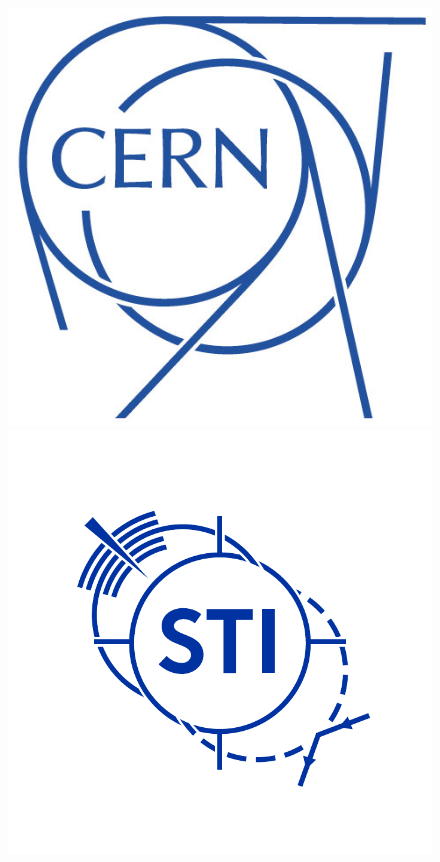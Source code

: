 \documentclass[encoding=utf8,british]{tumphthesis}
\begin{document}
\begin{titlepage}
\begin{figure}
\begin{minipage}{0.23\textwidth}
    \end{minipage}
    \hfill
    \begin{minipage}{0.23\textwidth}
    \centering
    \includegraphics[width=1.0\linewidth]{Abbildungen/cern-logo-with-bkg.jpg}
    \end{minipage}
    \hfill
    \begin{minipage}{0.23\textwidth}
    \centering
    \includegraphics[width=1.25\linewidth]{Abbildungen/Logo_STI.pdf}
    \end{minipage}
\end{figure}
 

\end{titlepage}
\end{document}
